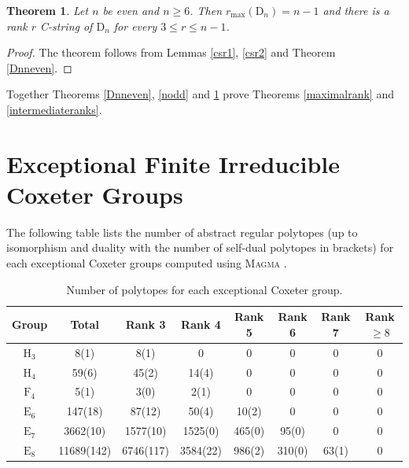 \documentclass{amsart}
\numberwithin{equation}{section}
\theoremstyle{plain} %
\newtheorem{theorem}{Theorem}[section]
\begin{document}
\begin{theorem}\label{neven}
Let $n$ be even and $n \ge 6$. Then $r_{\mathrm{max}}(\mathrm{D}_n)=n-1$ and there is a rank $r$ C-string of $\mathrm{D}_n$ for every $3 \leq r \leq n-1$.
\end{theorem}

\begin{proof}
The theorem follows from Lemmas \ref{csr1}, \ref{csr2} and Theorem \ref{Dnneven}.
\end{proof}

Together Theorems \ref{Dnneven}, \ref{nodd} and \ref{neven} prove Theorems \ref{maximalrank} and \ref{intermediateranks}.


\section{Exceptional Finite Irreducible Coxeter Groups} \label{census}

The following table lists the number of abstract regular polytopes (up to isomorphism and duality with the number of self-dual polytopes in brackets) for each exceptional Coxeter groups computed using \textsc{Magma} \cite{magma}.

\begin{table}[h!] \caption{Number of polytopes for each exceptional Coxeter group.} %
\centering
\begin{tabular}{|c|c|c|c|c|c|c|c|} \hline
Group & Total & Rank 3 & Rank 4 & Rank 5 & Rank 6 & Rank 7 & Rank $\ge8$ \\ \hline
$\mathrm{H}_3$ & 8(1) & 8(1) & 0 & 0 & 0 & 0 & 0 \\ \hline
$\mathrm{H}_4$ & 59(6) & 45(2) & 14(4) & 0 & 0 & 0 & 0 \\ \hline
$\mathrm{F}_4$ & 5(1) & 3(0) & 2(1) & 0 & 0 & 0 & 0 \\ \hline
$\mathrm{E}_6$ & 147(18) & 87(12) & 50(4) & 10(2) & 0 & 0 & 0 \\ \hline
$\mathrm{E}_7$ & 3662(10) & 1577(10) & 1525(0) & 465(0) & 95(0) & 0 & 0 \\ \hline
$\mathrm{E}_8$ & 11689(142) & 6746(117) & 3584(22) & 986(2) & 310(0) & 63(1) & 0 \\ \hline
\end{tabular}
\end{table}


\end{document}
